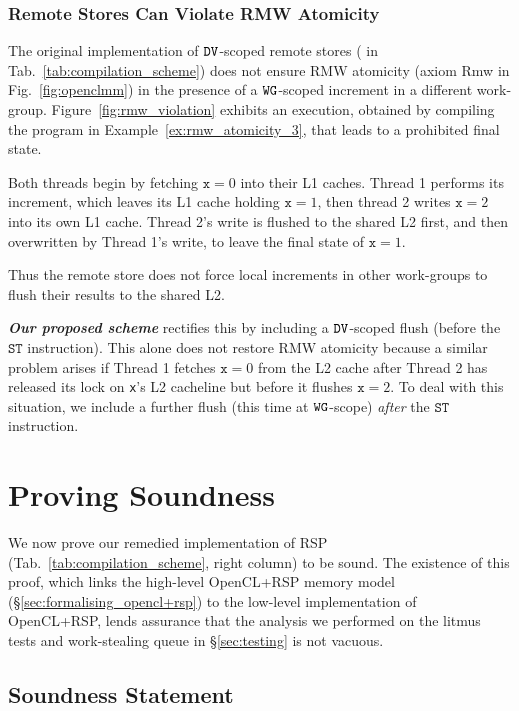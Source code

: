 \documentclass[svgnames,10pt]{sigplanconf}
\theoremstyle{definition}
\newcommand\axiom[1]{\textsf{#1}}
\newcommand\swg{{\tt WG}}
\newcommand\sdv{{\tt DV}}
\newcommand\INSst{\texttt{ST}}
\begin{document}
\subsubsection{Remote Stores Can Violate RMW Atomicity}
The original implementation of $\sdv$-scoped remote stores (
in Tab.~\ref{tab:compilation_scheme}) does not ensure RMW atomicity
(axiom \axiom{Rmw} in Fig.~\ref{fig:openclmm}) in the presence of a
$\swg$-scoped increment in a different
work-group. Figure~\ref{fig:rmw_violation} exhibits an execution,
obtained by compiling the program in Example~\ref{ex:rmw_atomicity_3},
that leads to a prohibited final state.

Both threads begin by fetching $\texttt{x}=0$ into their L1
caches. Thread 1 performs its increment, which leaves its L1
cache holding $\texttt{x}=1$, then thread 2 writes $\texttt{x}=2$ into
its own L1 cache. Thread 2's write is flushed to the shared L2 first,
and then overwritten by Thread 1's write, to leave the final state of
$\texttt{x}=1$.

Thus the remote store does not force
local increments in other work-groups to flush their results to the
shared L2.

\textbf{\itshape Our proposed scheme} rectifies this by including a
$\sdv$-scoped flush (before the $\INSst$ instruction). This alone does
not restore RMW atomicity because a similar problem arises if Thread 1
fetches $\texttt{x}=0$ from the L2 cache after Thread 2 has released
its lock on \texttt{x}'s L2 cacheline but before it flushes
$\texttt{x}=2$. To deal with this situation, we include a further
flush (this time at $\swg$-scope) \emph{after} the $\INSst$
instruction.


\section{Proving Soundness}
\label{sec:soundness}

We now prove our remedied implementation of RSP
(Tab.~\ref{tab:compilation_scheme}, right column) to be sound. The existence of
this proof, which links the high-level OpenCL+RSP memory model
(\S\ref{sec:formalising_opencl+rsp}) to the low-level implementation
of OpenCL+RSP, lends assurance that the analysis we
performed on the litmus tests and work-stealing queue in
\S\ref{sec:testing} is not vacuous.

\subsection{Soundness Statement} 
\end{document}
